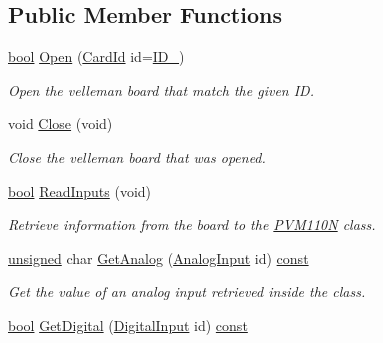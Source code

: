 \subsection*{Public Member Functions}
\begin{DoxyCompactItemize}
\item 
\hyperlink{term__entry_8h_a002004ba5d663f149f6c38064926abac}{bool} \hyperlink{classhbs_1_1_p_v_m110_n_a0ba7bc921ff0e908bd5751fda9ab1d14}{Open} (\hyperlink{classhbs_1_1_p_v_m110_n_a5716cfee1fa873caf6bf841229c9cb00}{Card\-Id} id=\hyperlink{classhbs_1_1_p_v_m110_n_a5716cfee1fa873caf6bf841229c9cb00a4b22ef70d42bf7fe27994b8be52a982b}{I\-D\-\_})
\begin{DoxyCompactList}\small\item\em Open the velleman board that match the given I\-D. \end{DoxyCompactList}\item 
void \hyperlink{classhbs_1_1_p_v_m110_n_a2a4a0ba137ccbf6c39ad58d929e11969}{Close} (void)
\begin{DoxyCompactList}\small\item\em Close the velleman board that was opened. \end{DoxyCompactList}\item 
\hyperlink{term__entry_8h_a002004ba5d663f149f6c38064926abac}{bool} \hyperlink{classhbs_1_1_p_v_m110_n_a615d9b1a069e5e8bb9fda30f4d4e99f5}{Read\-Inputs} (void)
\begin{DoxyCompactList}\small\item\em Retrieve information from the board to the \hyperlink{classhbs_1_1_p_v_m110_n}{P\-V\-M110\-N} class. \end{DoxyCompactList}\item 
\hyperlink{curses_8priv_8h_aca40206900cfc164654362fa8d4ad1e6}{unsigned} char \hyperlink{classhbs_1_1_p_v_m110_n_aa3255c503bf7d43215e51b1c3982237d}{Get\-Analog} (\hyperlink{classhbs_1_1_p_v_m110_n_ace5ddf4b54079516206c07f915c88d97}{Analog\-Input} id) \hyperlink{term__entry_8h_a57bd63ce7f9a353488880e3de6692d5a}{const} 
\begin{DoxyCompactList}\small\item\em Get the value of an analog input retrieved inside the class. \end{DoxyCompactList}\item 
\hyperlink{term__entry_8h_a002004ba5d663f149f6c38064926abac}{bool} \hyperlink{classhbs_1_1_p_v_m110_n_a3708da13b16173d45aff614f39d74bf7}{Get\-Digital} (\hyperlink{classhbs_1_1_p_v_m110_n_aa2574dc931283e208ba911ecd97ac8fa}{Digital\-Input} id) \hyperlink{term__entry_8h_a57bd63ce7f9a353488880e3de6692d5a}{const} 

\end{DoxyCompactItemize}
